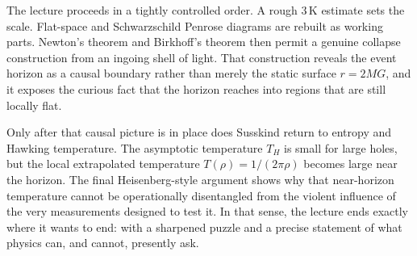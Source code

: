 The lecture proceeds in a tightly controlled order. A rough \(3\,\mathrm{K}\) estimate sets the scale. Flat-space and Schwarzschild Penrose diagrams are rebuilt as working parts. Newton's theorem and Birkhoff's theorem then permit a genuine collapse construction from an ingoing shell of light. That construction reveals the event horizon as a causal boundary rather than merely the static surface \(r=2MG\), and it exposes the curious fact that the horizon reaches into regions that are still locally flat.

Only after that causal picture is in place does Susskind return to entropy and Hawking temperature. The asymptotic temperature \(T_H\) is small for large holes, but the local extrapolated temperature \(T(\rho)=1/(2\pi\rho)\) becomes large near the horizon. The final Heisenberg-style argument shows why that near-horizon temperature cannot be operationally disentangled from the violent influence of the very measurements designed to test it. In that sense, the lecture ends exactly where it wants to end: with a sharpened puzzle and a precise statement of what physics can, and cannot, presently ask.